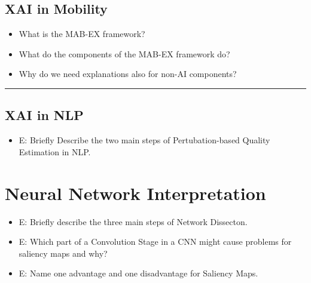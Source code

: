 \documentclass{report}
\newcommand{\asw}[2][teal]{}
\renewcommand{\asw}[2][teal]{\textcolor{#1}{#2}}
\begin{document}
		\subsection{XAI in Mobility}
		
		\begin{itemize}
		\item What is the MAB-EX framework?
		\item What do the components of the MAB-EX framework do?
		\item Why do we need explanations also for non-AI components?
		\end{itemize}
		\hrule 
	
		\subsection{XAI in NLP}
		
		\begin{itemize}
		\item E: Briefly Describe the two main steps of Pertubation-based Quality Estimation in NLP.
		\asw{\newline }
		\end{itemize}
	\newpage
	
	\section{Neural Network Interpretation}
	
	\begin{itemize}
		\item E: Briefly describe the three main steps of Network Dissecton.
		\asw{\newline }
		\item E: Which part of a Convolution Stage in a CNN might cause problems for saliency maps and why?
		\asw{\newline }
		\item E: Name one advantage and one disadvantage for Saliency Maps.
		\asw{\newline }
	\end{itemize}
	
\end{document}
